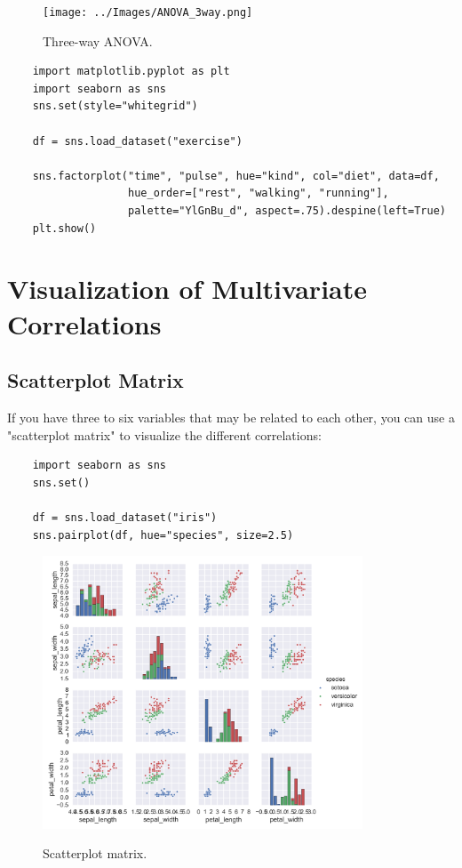 \begin{figure}
  \centering
  \texttt{[image: ../Images/ANOVA\_3way.png]}\\
  \caption{Three-way ANOVA.}\label{fig:ANOVA3way}
\end{figure}

\begin{lstlisting}
    import matplotlib.pyplot as plt
    import seaborn as sns
    sns.set(style="whitegrid")

    df = sns.load_dataset("exercise")

    sns.factorplot("time", "pulse", hue="kind", col="diet", data=df,
                   hue_order=["rest", "walking", "running"],
                   palette="YlGnBu_d", aspect=.75).despine(left=True)
    plt.show()
\end{lstlisting}

\section{Visualization of Multivariate Correlations}

\subsection{Scatterplot Matrix}

If you have three to six variables that may be related to each other, you can use a "scatterplot matrix" to visualize the different correlations:

\begin{lstlisting}
    import seaborn as sns
    sns.set()

    df = sns.load_dataset("iris")
    sns.pairplot(df, hue="species", size=2.5)
\end{lstlisting}

\begin{figure}
  \centering
  \includegraphics[width=0.85\textwidth]{../Images/multiScatterplot.png}\\
  \caption{Scatterplot matrix.}\label{fig:scatterplotMatrix}
\end{figure}


